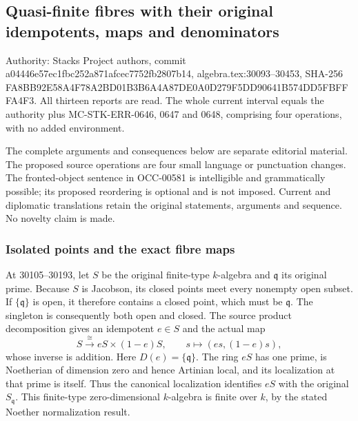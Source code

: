 \subsection{Quasi-finite fibres with their original idempotents, maps and denominators}\label{algebra-proof-031-quasi-finite-fibres-with-their-original-idempotents-maps-and-denominators}

Authority: Stacks Project authors, commit a044\allowbreak{}46e5\allowbreak{}7ec1\allowbreak{}fbc2\allowbreak{}52a8\allowbreak{}71af\allowbreak{}cec7\allowbreak{}752f\allowbreak{}b280\allowbreak{}7b14, algebra.tex:30093--30453, SHA-256 FA8B\allowbreak{}B92E\allowbreak{}58A4\allowbreak{}F78A\allowbreak{}2BD0\allowbreak{}1B3B\allowbreak{}6A4A\allowbreak{}87DE\allowbreak{}0A0D\allowbreak{}279F\allowbreak{}5DD9\allowbreak{}0641\allowbreak{}B574\allowbreak{}DD5F\allowbreak{}BFFF\allowbreak{}A4F3. All thirteen reports are read. The whole current interval equals the authority plus MC-STK-ERR-0646, 0647 and 0648, comprising four operations, with no added environment.

The complete arguments and consequences below are separate editorial material. The proposed source operations are four small language or punctuation changes. The fronted-object sentence in OCC-00581 is intelligible and grammatically possible; its proposed reordering is optional and is not imposed. Current and diplomatic translations retain the original statements, arguments and sequence. No novelty claim is made.

\subsubsection{Isolated points and the exact fibre maps}\label{algebra-proof-031-isolated-points-and-the-exact-fibre-maps}

At 30105--30193, let \(S\) be the original finite-type \(k\)-algebra and \(\mathfrak q\) its original prime. Because \(S\) is Jacobson, its closed points meet every nonempty open subset. If \(\{\mathfrak q\}\) is open, it therefore contains a closed point, which must be \(\mathfrak q\). The singleton is consequently both open and closed. The source product decomposition gives an idempotent \(e\in S\) and the actual map \[
 S\xrightarrow{\cong}eS\times(1-e)S,\qquad s\longmapsto(es,(1-e)s),
\] whose inverse is addition. Here \(D(e)=\{\mathfrak q\}\). The ring \(eS\) has one prime, is Noetherian of dimension zero and hence Artinian local, and its localization at that prime is itself. Thus the canonical localization identifies \(eS\) with the original \(S_{\mathfrak q}\). This finite-type zero-dimensional \(k\)-algebra is finite over \(k\), by the stated Noether normalization result.

